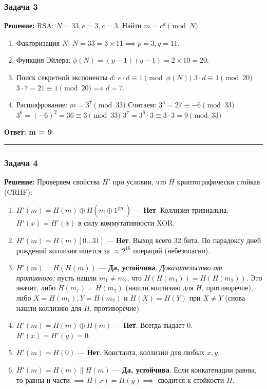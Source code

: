\subsubsection{Задача 3}\label{ux437ux430ux434ux430ux447ux430-3}

\textbf{Решение:} RSA: \(N=33, e=3, c=3\). Найти \(m = c^d \pmod N\).

\begin{enumerate}
\def\labelenumi{\arabic{enumi}.}
\tightlist
\item
  Факторизация \(N\): \(N = 33 = 3 \times 11 \implies p=3, q=11\).
\item
  Функция Эйлера: \(\phi(N) = (p-1)(q-1) = 2 \times 10 = 20\).
\item
  Поиск секретной экспоненты \(d\): \(e \cdot d \equiv 1 \pmod{\phi(N)}\) \(3 \cdot d \equiv 1 \pmod{20}\) \(3 \cdot 7 = 21 \equiv 1 \pmod{20} \implies d = 7\).
\item
  Расшифрование: \(m = 3^7 \pmod{33}\) Считаем: \(3^3 = 27 \equiv -6 \pmod{33}\) \(3^6 = (-6)^2 = 36 \equiv 3 \pmod{33}\) \(3^7 = 3^6 \cdot 3 \equiv 3 \cdot 3 = 9 \pmod{33}\)
\end{enumerate}

\textbf{Ответ: m = 9}

\begin{center}\rule{0.5\linewidth}{0.5pt}\end{center}

\subsubsection{Задача 4}\label{ux437ux430ux434ux430ux447ux430-4}

\textbf{Решение:} Проверяем свойства \(H'\) при условии, что \(H\) криптографически стойкая (CRHF):

\begin{enumerate}
\def\labelenumi{\arabic{enumi}.}
\tightlist
\item
  \(H'(m) = H(m) \oplus H(m \oplus 1^{|m|})\) --- \textbf{Нет}. Коллизия тривиальна: \(H'(x) = H'(\bar{x})\) в силу коммутативности XOR.
\item
  \(H'(m) = H(m)[0\dots31]\) --- \textbf{Нет}. Выход всего 32 бита. По парадоксу дней рождений коллизия ищется за \(\approx 2^{16}\) операций (небезопасно).
\item
  \(H'(m) = H(H(m))\) --- \textbf{Да, устойчива}. \emph{Доказательство от противного:} пусть нашли \(m_1 \neq m_2\), что \(H(H(m_1)) = H(H(m_2))\). Это значит, либо \(H(m_1) = H(m_2)\) (нашли коллизию для \(H\), противоречие), либо \(X = H(m_1), Y = H(m_2)\) и \(H(X) = H(Y)\) при \(X \neq Y\) (снова нашли коллизию для \(H\), противоречие).
\item
  \(H'(m) = H(m) \oplus H(m)\) --- \textbf{Нет}. Всегда выдает 0. \(H'(x) = H'(y) = 0\).
\item
  \(H'(m) = H(0)\) --- \textbf{Нет}. Константа, коллизии для любых \(x, y\).
\item
  \(H'(m) = H(m) \parallel H(m)\) --- \textbf{Да, устойчива}. Если конкатенации равны, то равны и части \(\implies H(x)=H(y) \implies\) сводится к стойкости \(H\).
\end{enumerate}

